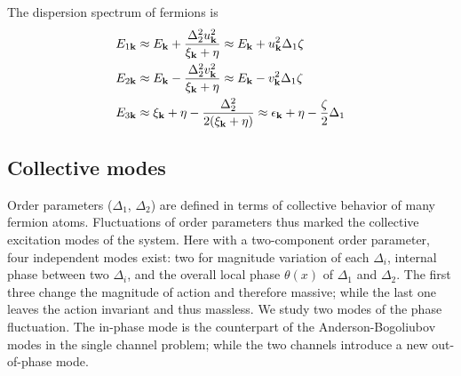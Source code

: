 \documentclass[reprint,pra]{revtex4-1}
\begin{document}
The dispersion spectrum of fermions is
\begin{align}\label{eq:pathInt2:xiExpand}
E_{1\mathbf{k}}&\approx{}E_{\mathbf{k}}+\frac{\Delta_{2}^{2}u_{\mathbf{k}}^{2}}{\xi_{\mathbf{k}}+\eta}
\approx{}E_{\mathbf{k}}+u_{\mathbf{k}}^{2}\Delta_{1}\zeta\\
E_{2\mathbf{k}}&\approx{}E_{\mathbf{k}}-\frac{\Delta_{2}^{2}v_{\mathbf{k}}^{2}}{\xi_{\mathbf{k}}+\eta}
\approx{}E_{\mathbf{k}}-v_{\mathbf{k}}^{2}\Delta_{1}\zeta\label{eq:pathInt2:xiExpand2}\\
E_{3\mathbf{k}}&\approx{}\xi_{\mathbf{k}}+\eta-\frac{\Delta_{2}^{2}}{2(\xi_{\mathbf{k}}+\eta)}
\approx{}\epsilon_{\mathbf{k}}+\eta-\frac{\zeta}{2}\Delta_{1}
\label{eq:pathInt2:xiExpand3}
\end{align}





\subsection{Collective modes}
Order parameters ($\Delta_{1}$, $\Delta_{2}$) are defined in terms of collective behavior of many fermion atoms.  Fluctuations of order parameters thus marked the collective excitation modes of the system. Here with a two-component order parameter, four independent modes exist:   two for magnitude variation of each $\Delta_i$,  internal phase between two $\Delta_i$, and the overall local phase $\theta(x)$ of $\Delta_1$ and $\Delta_2$.  The first three change the magnitude of action and therefore massive; while the last one leaves the action invariant and thus massless. 
We study two modes of the phase fluctuation.  The in-phase mode is the counterpart of the Anderson-Bogoliubov modes in the single channel problem; while the two channels introduce a new out-of-phase mode. 
\end{document}

